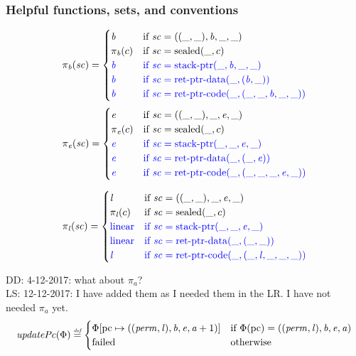 \documentclass[a3paper]{article}
\newcommand\lau[1]{{\color{purple} \sf \footnotesize {LS: #1}}\\}
\newcommand\dominique[1]{{\color{purple} \sf \footnotesize {DD: #1}}\\}
\newcommand{\defeq}{\stackrel{\textit{\tiny{def}}}{=}}
\newcommand{\totherwise}{\text{otherwise }}
\newcommand{\sourcecolor}{\color{blue}}
\newcommand{\src}[1]{{\sourcecolor #1}}
\newcommand{\update}[2]{[#1 \mapsto #2]}
\newcommand{\shareddom}[1]{\mathrm{#1}}
\newcommand{\perm}{\var{perm}}
\newcommand{\lin}{\var{l}}
\newcommand{\stkptr}[1]{\mathrm{stack\text{-}ptr}(#1)}
\newcommand{\retptrd}{\mathrm{ret\text{-}ptr\text{-}data}}
\newcommand{\retptrc}{\mathrm{ret\text{-}ptr\text{-}code}}
\newcommand{\sealed}[1]{\shareddom{sealed}(#1)}
\newcommand{\failed}{\mathrm{failed}}
\newcommand{\var}[1]{\mathit{#1}}
\newcommand{\vsc}{\var{sc}}
\newcommand{\baddr}{\var{b}}
\newcommand{\eaddr}{\var{e}}
\newcommand{\aaddr}{\var{a}}
\newcommand{\pcreg}{\mathrm{pc}}
\newcommand{\plainlinearity}[1]{\mathrm{#1}}
\newcommand{\linear}{\plainlinearity{linear}}
\newcommand{\plainfun}[2]{
  \ifthenelse{\equal{#2}{}}
  {\mathit{#1}}
  {\mathit{#1}(#2)}
}
\newcommand{\updPcAddr}[1]{\plainfun{updatePc}{#1}}
\begin{document}
\subsubsection{Helpful functions, sets, and conventions}

\[
  \pi_\baddr(\vsc) =
  \begin{cases}
    \baddr & \text{if $\vsc = ((\_,\_),\baddr,\_,\_)$} \\ 
    \pi_\baddr(c) & \text{if $\vsc = \sealed{\_,c}$} \\ 
    \src{\baddr} & \src{\text{if $\vsc = \stkptr{\_,\baddr,\_,\_}$}} \\ 
    \src{\baddr} & \src{\text{if $\vsc = \retptrd(\_,(\baddr,\_))$}} \\ 
    \src{\baddr} & \src{\text{if $\vsc = \retptrc(\_,(\_,\_,\baddr,\_,\_))$}}
  \end{cases}
\]
\[
  \pi_\eaddr(\vsc) =
  \begin{cases}
    \eaddr & \text{if $\vsc = ((\_,\_),\_,\eaddr,\_)$} \\ 
    \pi_\eaddr(c) & \text{if $\vsc = \sealed{\_,c}$} \\ 
    \src{\eaddr} & \src{\text{if $\vsc = \stkptr{\_,\_,\eaddr,\_}$}} \\ 
    \src{\eaddr} & \src{\text{if $\vsc = \retptrd(\_,(\_,\eaddr))$}} \\ 
    \src{\eaddr} & \src{\text{if $\vsc = \retptrc(\_,(\_,\_,\_,\eaddr,\_))$}}
  \end{cases}
\]

\[
  \pi_\lin(\vsc) = 
  \begin{cases}
    \lin & \text{if $\vsc = ((\_,\_),\_,\eaddr,\_)$} \\ 
    \pi_\lin(c) & \text{if $\vsc = \sealed{\_,c}$} \\ 
    \src{\linear} & \src{\text{if $\vsc = \stkptr{\_,\_,\eaddr,\_}$}} \\ 
    \src{\linear} & \src{\text{if $\vsc = \retptrd(\_,(\_,\_))$}} \\ 
    \src{\lin} & \src{\text{if $\vsc = \retptrc(\_,(\_,\lin,\_,\_,\_))$}}
  \end{cases}
\]

\dominique{4-12-2017: what about $\pi_a$?}
\lau{12-12-2017: I have added them as I needed them in the LR. I have not needed $\pi_a$ yet.}
\[
  \updPcAddr{\Phi} \defeq 
  \begin{cases}
    \Phi\update{\pcreg}{((\perm,\lin),\baddr,\eaddr,\aaddr+1)} & \text{if $\Phi(\pcreg) = ((\perm,\lin),\baddr,\eaddr,\aaddr)$}\\
    \failed & \totherwise
  \end{cases}
\]
\end{document}
